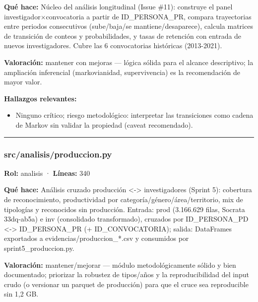 \textbf{Qué hace:} Núcleo del análisis longitudinal (Issue \#11): construye el panel investigador$\times$convocatoria a partir de ID\_PERSONA\_PR, compara trayectorias entre periodos consecutivos (sube/baja/se mantiene/desaparece), calcula matrices de transición de conteos y probabilidades, y tasas de retención con entrada de nuevos investigadores. Cubre las 6 convocatorias históricas (2013-2021).

\textbf{Valoración:} mantener con mejoras --- lógica sólida para el alcance descriptivo; la ampliación inferencial (markovianidad, supervivencia) es la recomendación de mayor valor.

\textbf{Hallazgos relevantes:}
\begin{itemize}
  \item Ninguno crítico; riesgo metodológico: interpretar las transiciones como cadena de Markov sin validar la propiedad (caveat recomendado).
\end{itemize}

\medskip
\hrule

\subsubsection{src/analisis/produccion.py}
\textbf{Rol:} analisis · \textbf{Líneas:} 340

\textbf{Qué hace:} Análisis cruzado producción <-> investigadores (Sprint 5): cobertura de reconocimiento, productividad por categoría/género/área/territorio, mix de tipologías y reconocidos sin producción. Entrada: prod (3.166.629 filas, Socrata 33dq-ab5a) e inv (consolidado transformado), cruzados por ID\_PERSONA\_PD <-> ID\_PERSONA\_PR (+ ID\_CONVOCATORIA); salida: DataFrames exportados a evidencias/produccion\_*.csv y consumidos por sprint5\_produccion.py.

\textbf{Valoración:} mantener/mejorar --- módulo metodológicamente sólido y bien documentado; priorizar la robustez de tipos/años y la reproducibilidad del input crudo (o versionar un parquet de producción) para que el cruce sea reproducible sin 1,2 GB.

